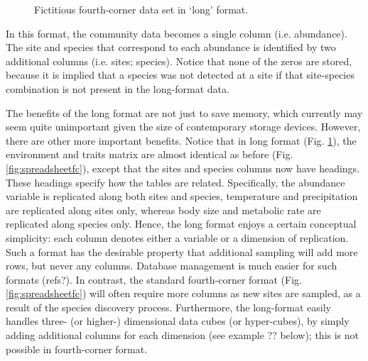 \documentclass{article}
\numberwithin{exercise}{section}
\begin{document}
\begin{figure}
\caption{Fictitious fourth-corner data set in `long' format.}
\label{fig:longspreadsheetfc}
\end{figure}In this format, the community data becomes a single column (i.e. abundance).  The site and species that correspond to each abundance is identified by two additional columns (i.e. sites; species).  Notice that none of the zeros are stored, because it is implied that a species was not detected at a site if that site-species combination is not present in the long-format data.

The benefits of the long format are not just to save memory, which currently may seem quite unimportant given the size of contemporary storage devices.  However, there are other more important benefits.  Notice that in long format (Fig. \ref{fig:longspreadsheetfc}), the environment and traits matrix are almost identical as before (Fig. \ref{fig:spreadsheetfc}), except that the sites and species columns now have headings.  These headings specify how the tables are related.  Specifically, the abundance variable is replicated along both sites and species, temperature and precipitation are replicated along sites only, whereas body size and metabolic rate are replicated along species only.  Hence, the long format enjoys a certain conceptual simplicity:  each column denotes either a variable or a dimension of replication.  Such a format has the desirable property that additional sampling will add more rows, but never any columns.  Database management is much easier for such formats (refs?).  In contrast, the standard fourth-corner format (Fig. \ref{fig:spreadsheetfc}) will often require more columns as new sites are sampled, as a result of the species discovery process.  Furthermore, the long-format easily handles three- (or higher-) dimensional data cubes (or hyper-cubes), by simply adding additional columns for each dimension (see example ?? below); this is not possible in fourth-corner format.
\end{document}
